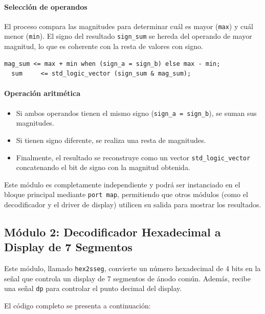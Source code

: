 \documentclass[a4paper,12pt]{article}
\begin{document}
\paragraph{Selección de operandos}
El proceso compara las magnitudes para determinar cuál es mayor (\texttt{max}) y cuál menor (\texttt{min}).  
El signo del resultado \texttt{sign\_sum} se hereda del operando de mayor magnitud, lo que es coherente con la resta de valores con signo.

\begin{lstlisting}[caption={Operacion Aritmetica}, label={lst:sum_sign}]
  mag_sum <= max + min when (sign_a = sign_b) else max - min; 
  sum     <= std_logic_vector (sign_sum & mag_sum);
\end{lstlisting}

\paragraph{Operación aritmética}
\begin{itemize}
    \item Si ambos operandos tienen el mismo signo (\texttt{sign\_a = sign\_b}), se suman sus magnitudes.
    \item Si tienen signo diferente, se realiza una resta de magnitudes.
    \item Finalmente, el resultado se reconstruye como un vector \texttt{std\_logic\_vector} concatenando el bit de signo con la magnitud obtenida.
\end{itemize}

Este módulo es completamente independiente y podrá ser instanciado en el bloque principal mediante \texttt{port map}, permitiendo que otros módulos (como el decodificador y el driver de display) utilicen su salida para mostrar los resultados.

\subsection{Módulo 2: Decodificador Hexadecimal a Display de 7 Segmentos}

Este módulo, llamado \texttt{hex2sseg}, convierte un número hexadecimal de 4 bits en la señal que controla un display de 7 segmentos de ánodo común.  
Además, recibe una señal \texttt{dp} para controlar el punto decimal del display.

El código completo se presenta a continuación:

\newpage
\end{document}
